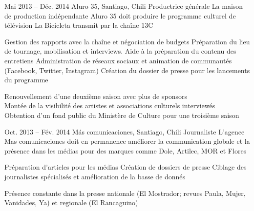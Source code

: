 \documentclass[30pt, french]{tccv}
\begin{document}
\begin{upshape}
\begin{textblock}{13}
\begin{mdframed}
\begin{eventlist}
\setlength{\parskip}{0pt}        
\item{Mai 2013 -- Déc. 2014}
     {Aluro 35, Santiago, Chili}
     {Productrice générale}
     \fontsize{9pt}{1em}\color{text}\bodyfontlight\upshape\selectfont
     La maison de production indépendante Aluro 35 doit produire le programme culturel de télévision La Bicicleta transmit par la chaîne 13C \\
    
    \setlength{\parskip}{-10pt}
    \begin{itemize}
      \setlength\itemsep{-3pt} 
      \cvitem[\checkmark] Gestion des rapports avec la chaîne et négociation de budgets                       
      \cvitem[\checkmark] Préparation du lieu de tournage, mobilisation et interviews. Aide à la préparation du contenu des entretiens 
      \cvitem[\checkmark] Administration de réseaux sociaux et animation de communautés (Facebook, Twitter, Instagram)                 
      \cvitem[\checkmark] Création du dossier de presse pour les lancements du programme                                               
    \end{itemize}     
 Renouvellement d'une deuxième saison avec plus de sponsors \\
\makebox[1.4cm][l]{}	       Montée de la visibilité des artistes et associations culturels interviewés \\
\makebox[1.4cm][l]{}           Obtention d’un fond public du Ministère de Culture pour une troisième saison  \\


\setlength{\parskip}{0pt}    
\item{Oct. 2013 -- Fév. 2014 }     
  {Más comunicaciones, Santiago, Chili}     
  {Journaliste}
     \fontsize{9pt}{1em}\color{text}\bodyfontlight\upshape\selectfont
{} L’agence Mas comunicaciones doit en permanence améliorer la communication globale et la présence dans les médias
pour des marques comme Dole, Artilec, MOR et Flores\\

\setlength{\parskip}{-10pt}
\begin{itemize}
      \setlength\itemsep{-3pt} 
      \cvitem[\checkmark]  Préparation d'articles pour les médias                                            
      \cvitem[\checkmark]  Création de dossiers de presse                                                     
      \cvitem[\checkmark]  Ciblage des journalistes spécialisés et amélioration de la basse de donnés  
\end{itemize}       
 Présence constante dans la presse nationale (El Mostrador; revues Paula, Mujer, Vanidades, Ya) et regionale (El Rancaguino) 


\end{eventlist}
\end{mdframed}
\end{textblock}
\end{upshape}
\end{document}
